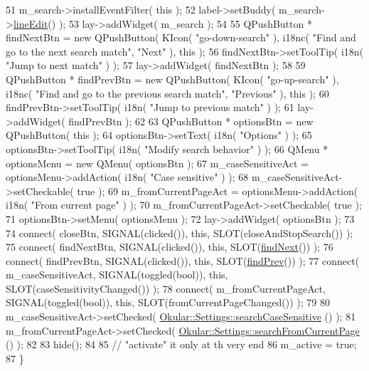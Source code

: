 \begin{DoxyCode}
51     m\_search->installEventFilter( \textcolor{keyword}{this} );
52     label->setBuddy( m\_search->\hyperlink{classSearchLineWidget_a8e61338244bd9d2e593a72078d3d7afc}{lineEdit}() );
53     lay->addWidget( m\_search );
54 
55     QPushButton * findNextBtn = \textcolor{keyword}{new} QPushButton( KIcon( \textcolor{stringliteral}{"go-down-search"} ), i18nc( \textcolor{stringliteral}{"Find and go to the next
       search match"}, \textcolor{stringliteral}{"Next"} ), \textcolor{keyword}{this} );
56     findNextBtn->setToolTip( i18n( \textcolor{stringliteral}{"Jump to next match"} ) );
57     lay->addWidget( findNextBtn );
58 
59     QPushButton * findPrevBtn = \textcolor{keyword}{new} QPushButton( KIcon( \textcolor{stringliteral}{"go-up-search"} ), i18nc( \textcolor{stringliteral}{"Find and go to the
       previous search match"}, \textcolor{stringliteral}{"Previous"} ), \textcolor{keyword}{this} );
60     findPrevBtn->setToolTip( i18n( \textcolor{stringliteral}{"Jump to previous match"} ) );
61     lay->addWidget( findPrevBtn );
62 
63     QPushButton * optionsBtn = \textcolor{keyword}{new} QPushButton( \textcolor{keyword}{this} );
64     optionsBtn->setText( i18n( \textcolor{stringliteral}{"Options"} ) );
65     optionsBtn->setToolTip( i18n( \textcolor{stringliteral}{"Modify search behavior"} ) );
66     QMenu * optionsMenu = \textcolor{keyword}{new} QMenu( optionsBtn );
67     m\_caseSensitiveAct = optionsMenu->addAction( i18n( \textcolor{stringliteral}{"Case sensitive"} ) );
68     m\_caseSensitiveAct->setCheckable( \textcolor{keyword}{true} );
69     m\_fromCurrentPageAct = optionsMenu->addAction( i18n( \textcolor{stringliteral}{"From current page"} ) );
70     m\_fromCurrentPageAct->setCheckable( \textcolor{keyword}{true} );
71     optionsBtn->setMenu( optionsMenu );
72     lay->addWidget( optionsBtn );
73 
74     connect( closeBtn, SIGNAL(clicked()), \textcolor{keyword}{this}, SLOT(closeAndStopSearch()) );
75     connect( findNextBtn, SIGNAL(clicked()), \textcolor{keyword}{this}, SLOT(\hyperlink{classFindBar_a85079b0239e7015c666ca945c45e23eb}{findNext}()) );
76     connect( findPrevBtn, SIGNAL(clicked()), \textcolor{keyword}{this}, SLOT(\hyperlink{classFindBar_aad5bd8d73882a4000465f8e0ae6dc130}{findPrev}()) );
77     connect( m\_caseSensitiveAct, SIGNAL(toggled(\textcolor{keywordtype}{bool})), \textcolor{keyword}{this}, SLOT(caseSensitivityChanged()) );
78     connect( m\_fromCurrentPageAct, SIGNAL(toggled(\textcolor{keywordtype}{bool})), \textcolor{keyword}{this}, SLOT(fromCurrentPageChanged()) );
79 
80     m\_caseSensitiveAct->setChecked( \hyperlink{classOkular_1_1Settings_a8d48ce79f6550882a1f534b7d9f585da}{Okular::Settings::searchCaseSensitive}
      () );
81     m\_fromCurrentPageAct->setChecked( \hyperlink{classOkular_1_1Settings_ab8c9672dbe258f4910756810c4b3db14}{Okular::Settings::searchFromCurrentPage}
      () );
82 
83     hide();
84 
85     \textcolor{comment}{// "activate" it only at th very end}
86     m\_active = \textcolor{keyword}{true};
87 \}
\end{DoxyCode}
